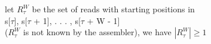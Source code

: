 \documentclass[preview]{standalone}
\begin{document}
\begin{center}
let $R^W_{\tau}$  be the set of reads with starting positions in\\ s[$\tau$], s[$\tau$ + 1], . . . , s[$\tau$ + W - 1] \\($R^W_{\tau}$ is not known by the assembler), we have $|R^W_{\tau}| \ge 1$
\end{center}
\end{document}
